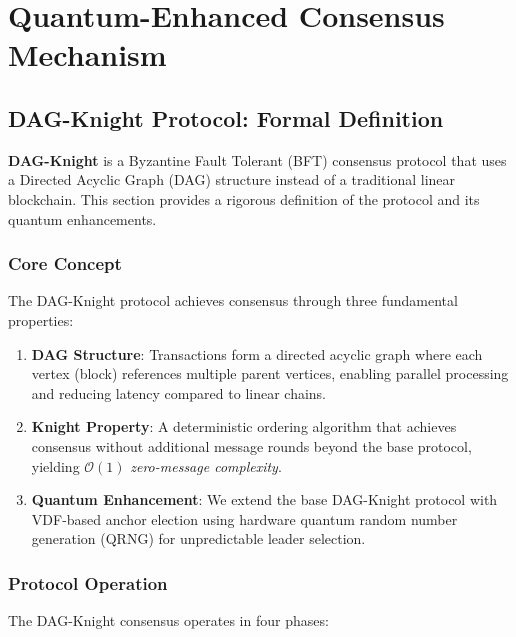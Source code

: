 \documentclass[11pt,a4paper]{article}
\begin{document}
\section{Quantum-Enhanced Consensus Mechanism}

\subsection{DAG-Knight Protocol: Formal Definition}

\textbf{DAG-Knight} is a Byzantine Fault Tolerant (BFT) consensus protocol that uses a Directed Acyclic Graph (DAG) structure instead of a traditional linear blockchain. This section provides a rigorous definition of the protocol and its quantum enhancements.

\subsubsection{Core Concept}

The DAG-Knight protocol achieves consensus through three fundamental properties:

\begin{enumerate}
    \item \textbf{DAG Structure}: Transactions form a directed acyclic graph where each vertex (block) references multiple parent vertices, enabling parallel processing and reducing latency compared to linear chains.

    \item \textbf{Knight Property}: A deterministic ordering algorithm that achieves consensus without additional message rounds beyond the base protocol, yielding $\mathcal{O}(1)$ \textit{zero-message complexity}.

    \item \textbf{Quantum Enhancement}: We extend the base DAG-Knight protocol with VDF-based anchor election using hardware quantum random number generation (QRNG) for unpredictable leader selection.
\end{enumerate}

\subsubsection{Protocol Operation}

The DAG-Knight consensus operates in four phases:
\end{document}
